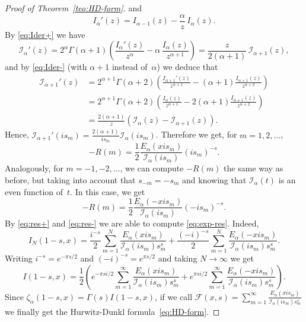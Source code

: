 \documentclass[a4paper]{amsart}
\newcommand{\I}{\mathcal{I}}
\newcommand{\Ea}{E_{\alpha}}
\theoremstyle{plain}
\theoremstyle{definition}
\theoremstyle{remark}
\numberwithin{equation}{section}
\begin{document}
\begin{proof}[Proof of Theorem~\ref{teo:HD-form}]
and
\begin{equation}
\label{eq:Ider-}
  I_\alpha'(z) = I_{\alpha-1}(z) - \frac{\alpha}{z}\,I_\alpha (z).
\end{equation}
By \eqref{eq:Ider+} we have
\begin{equation}
\label{eq:der-besselI}
  \I_\alpha'(z) = 2^\alpha \Gamma(\alpha+1) \left(\frac{I_\alpha'(z)}{z^\alpha}
  - \alpha \, \frac{I_\alpha(z)}{z^{\alpha+1}}\right)
  = \frac{z}{2(\alpha+1)} \, \I_{\alpha+1}(z),
\end{equation}
and by \eqref{eq:Ider-} (with $\alpha+1$ instead of~$\alpha$) we deduce that
\begin{align*}
  \I_{\alpha+1}'(z) &= 2^{\alpha+1} \Gamma(\alpha+2) \left(\frac{I_{\alpha+1}'(z)}{z^{\alpha+1}}
  - (\alpha+1)\frac{I_{\alpha+1}(z)}{z^{\alpha+2}}\right) \\
  &= 2^{\alpha+1} \Gamma(\alpha+2) \left(\frac{I_{\alpha}(z)}{z^{\alpha+1}}
  - 2(\alpha+1)\frac{I_{\alpha+1}(z)}{z^{\alpha+2}}\right) \\
  &= \frac{2(\alpha+1)}{z}(\I_{\alpha}(z)-\I_{\alpha+1}(z)).
\end{align*}
Hence, $\I_{\alpha+1}'(i s_m) = \frac{2(\alpha+1)}{i s_m}\I_{\alpha}(i s_m)$. Therefore we get, for $m =1, 2, \dots$,
\begin{equation}
\label{eq:res+}
  -R(m) = \frac{1}{2}\frac{\Ea(xis_m)}{\I_{\alpha}(i s_m)}(is_m)^{-s}.
\end{equation}
Analogously, for $m = -1, -2, \dots$, we can compute $-R(m)$ the same way as before, but taking into account that $s_{-m} = -s_m$ and knowing that $\I_{\alpha}(t)$ is an even function of~$t$. In this case, we get
\begin{equation}
\label{eq:res-}
    -R(m) = \frac{1}{2}\frac{\Ea(-xis_m)}{\I_{\alpha}(i s_m)}(-is_m)^{-s}.
\end{equation}
By \eqref{eq:res+} and \eqref{eq:res-} we are able to compute \eqref{eq:exp-res}. Indeed,
\begin{equation*}
  I_N(1-s,x) = \frac{i^{-s}}{2} \sum_{m=1}^{N} \frac{\Ea(xis_m)}{\I_{\alpha}(i s_m)s_m^s} 
  + \frac{(-i)^{-s}}{2} \sum_{m=1}^{N} \frac{\Ea(-xis_m)}{\I_{\alpha}(i s_m)s_m^s}.
\end{equation*}
Writing $i^{-s} = e^{-\pi s/2}$ and $(-i)^{-s} = e^{\pi s/2}$ and taking $N \to \infty$ we get
\begin{equation*}
  I(1-s,x) = \frac{1}{2}\left( e^{-\pi s i/2} \sum_{m=1}^{\infty} 
  \frac{\Ea(x i s_m)}{\I_{\alpha}(i s_m)s_m^s}
  + e^{\pi s i/2} \sum_{m=1}^{\infty} \frac{\Ea(-x i s_m)}{\I_{\alpha}(i s_m)s_m^s}\right).
\end{equation*}
Since $\zeta_{\alpha}(1-s,x) = \Gamma(s) I(1-s,x)$, if we call $\mathcal{F}(x,s) = \sum_{m=1}^{\infty} \frac{\Ea(x i s_m)}{\I_{\alpha}(i s_m)s_m^s}$ we finally get the Hurwitz-Dunkl formula~\eqref{eq:HD-form}.
\end{proof}
\end{document}

